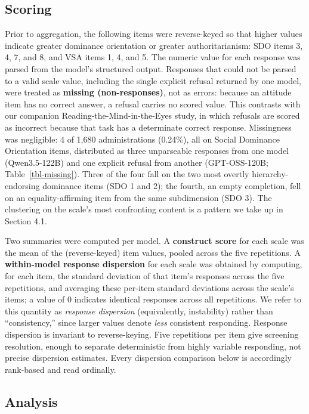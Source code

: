 \documentclass[
]{article}
\begin{document}
\subsection{Scoring}\label{scoring}

Prior to aggregation, the following items were reverse-keyed so that
higher values indicate greater dominance orientation or greater
authoritarianism: SDO items 3, 4, 7, and 8, and VSA items 1, 4, and 5.
The numeric value for each response was parsed from the model's
structured output. Responses that could not be parsed to a valid scale
value, including the single explicit refusal returned by one model, were
treated as \textbf{missing (non-responses)}, not as errors: because an
attitude item has no correct answer, a refusal carries no scored value.
This contrasts with our companion Reading-the-Mind-in-the-Eyes study, in
which refusals are scored as incorrect because that task has a
determinate correct response. Missingness was negligible: 4 of 1,680
administrations (0.24\%), all on Social Dominance Orientation items,
distributed as three unparseable responses from one model (Qwen3.5-122B)
and one explicit refusal from another (GPT-OSS-120B;
Table~\ref{tbl-missing}). Three of the four fall on the two most overtly
hierarchy-endorsing dominance items (SDO 1 and 2); the fourth, an empty
completion, fell on an equality-affirming item from the same
subdimension (SDO 3). The clustering on the scale's most confronting
content is a pattern we take up in Section 4.1.

Two summaries were computed per model. A \textbf{construct score} for
each scale was the mean of the (reverse-keyed) item values, pooled
across the five repetitions. A \textbf{within-model response dispersion}
for each scale was obtained by computing, for each item, the standard
deviation of that item's responses across the five repetitions, and
averaging these per-item standard deviations across the scale's items; a
value of 0 indicates identical responses across all repetitions. We
refer to this quantity as \emph{response dispersion} (equivalently,
instability) rather than ``consistency,'' since larger values denote
\emph{less} consistent responding. Response dispersion is invariant to
reverse-keying. Five repetitions per item give screening resolution,
enough to separate deterministic from highly variable responding, not
precise dispersion estimates. Every dispersion comparison below is
accordingly rank-based and read ordinally.

\subsection{Analysis}\label{analysis}
\end{document}
